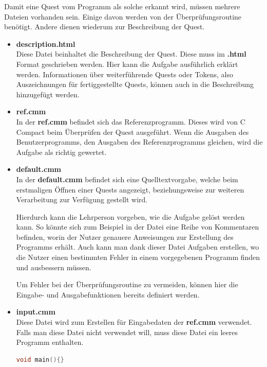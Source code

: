Damit eine Quest vom Programm als solche erkannt wird, müssen mehrere Dateien vorhanden sein. Einige davon werden von der Überprüfungsroutine benötigt. Andere dienen wiederum zur Beschreibung der Quest.

\begin{itemize}
\item \textbf{description.html}\\
Diese Datei beinhaltet die Beschreibung der Quest. Diese muss im \textbf{.html} Format geschrieben werden. Hier kann die Aufgabe ausführlich erklärt werden. Informationen über weiterführende Quests oder Tokens, also Auszeichnungen für fertiggestellte Quests, können auch in die Beschreibung hinzugefügt werden.

\item \textbf{ref.cmm}\\
In der \textbf{ref.cmm} befindet sich das Referenzprogramm. Dieses wird von C Compact beim Überprüfen der Quest ausgeführt. Wenn die Ausgaben des Benutzerprogramms, den Ausgaben des Referenzprogramms gleichen, wird die Aufgabe als richtig gewertet.

\item \textbf{default.cmm}\\
In der \textbf{default.cmm} befindet sich eine Quelltextvorgabe, welche beim erstmaligen Öffnen einer Quests angezeigt, beziehungsweise zur weiteren Verarbeitung zur Verfügung gestellt wird. 

Hierdurch kann die Lehrperson vorgeben, wie die Aufgabe gelöst werden kann. So könnte sich zum Beispiel in der Datei eine Reihe von Kommentaren befinden, worin der Nutzer genauere Anweisungen zur Erstellung des Programms erhält. Auch kann man dank dieser Datei Aufgaben erstellen, wo die Nutzer einen bestimmten Fehler in einem vorgegebenen Programm finden und ausbessern müssen. 

Um Fehler bei der Überprüfungsroutine zu vermeiden, können hier die Eingabe- und Ausgabefunktionen bereits definiert werden. 

\item \textbf{input.cmm}\\
Diese Datei wird zum Erstellen für Eingabedaten der \textbf{ref.cmm} verwendet. Falls man diese Datei nicht verwendet will, muss diese Datei ein leeres Programm enthalten. 
\begin{lstlisting}[language=C]
void main(){}
\end{lstlisting}
\end{itemize}

